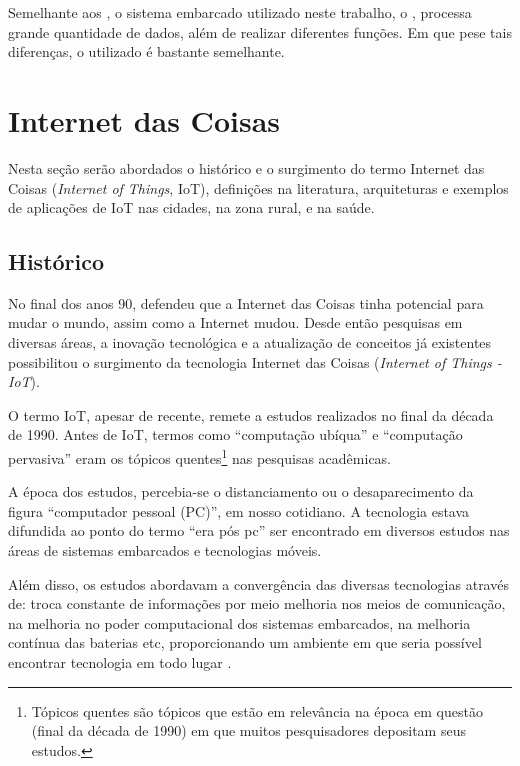 Semelhante aos \smartphones, o sistema embarcado utilizado neste trabalho, o
\stb[], processa grande quantidade de dados, além de realizar
diferentes funções. Em que pese tais diferenças, o \hardware[] utilizado é
bastante semelhante.

\section{Internet das Coisas} \label{sec:iot}

Nesta seção serão abordados o histórico e o surgimento do termo
Internet das Coisas (\textit{Internet of Things}, IoT), definições
na literatura, arquiteturas e exemplos de aplicações de IoT nas cidades,
na zona rural, e na saúde.

\subsection{Histórico} \label{subsec:iot-historico}

No final dos anos 90,  defendeu que a Internet
das Coisas tinha potencial para mudar o mundo, assim como a Internet mudou.
Desde então pesquisas em diversas áreas, a inovação tecnológica e a atualização
de conceitos já existentes possibilitou o surgimento da tecnologia Internet das
Coisas (\textit{Internet of Things - IoT}).

O termo IoT, apesar de recente, remete a estudos realizados no final da década
de 1990. Antes de IoT, termos como ``computação ubíqua'' e ``computação pervasiva''
eram os tópicos quentes\footnote{Tópicos quentes são tópicos que estão em relevância
na época em questão (final da década de 1990) em que muitos pesquisadores depositam seus 
estudos.} nas pesquisas acadêmicas.

A época dos estudos, percebia-se o distanciamento ou o desaparecimento da
figura ``computador pessoal (PC)'', em nosso cotidiano. A tecnologia estava
difundida ao ponto do termo  ``era pós pc'' ser encontrado em diversos estudos
\cite{bonilla2011inclusao,  chen2011pospc, press1999personal} nas áreas de
sistemas embarcados e tecnologias móveis.

Além disso, os estudos abordavam a convergência das diversas tecnologias 
através de: troca constante de informações por meio melhoria nos meios de comunicação,
na melhoria no poder computacional dos sistemas embarcados, na melhoria contínua 
das baterias etc, proporcionando um ambiente em que seria possível encontrar
tecnologia em todo lugar \cite{lyytinen2002ubiquitous}.

